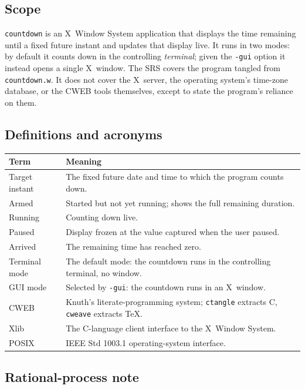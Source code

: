 \documentclass[12pt]{article}
\newcommand{\code}[1]{\texttt{#1}}
\begin{document}
\subsection{Scope}

\code{countdown} is an X~Window System application that displays the time
remaining until a fixed future instant and updates that display live.  It
runs in two modes: by default it counts down in the controlling
\emph{terminal}; given the \code{-gui} option it instead opens a single
X~window.  The SRS covers the program tangled from \code{countdown.w}.  It
does not cover the X~server, the operating system's time-zone database, or
the CWEB tools themselves, except to state the program's reliance on them.

\subsection{Definitions and acronyms}

\begin{longtable}{p{}p{}}
\toprule
\textbf{Term} & \textbf{Meaning} \\
\midrule
Target instant & The fixed future date and time to which the program counts down. \\
Armed & Started but not yet running; shows the full remaining duration. \\
Running & Counting down live. \\
Paused & Display frozen at the value captured when the user paused. \\
Arrived & The remaining time has reached zero. \\
Terminal mode & The default mode: the countdown runs in the controlling terminal, no window. \\
GUI mode & Selected by \code{-gui}: the countdown runs in an X~window. \\
CWEB & Knuth's literate-programming system; \code{ctangle} extracts C, \code{cweave} extracts \TeX. \\
Xlib & The C-language client interface to the X~Window System. \\
POSIX & IEEE Std 1003.1 operating-system interface. \\
\bottomrule
\end{longtable}

\subsection{Rational-process note}
\end{document}
